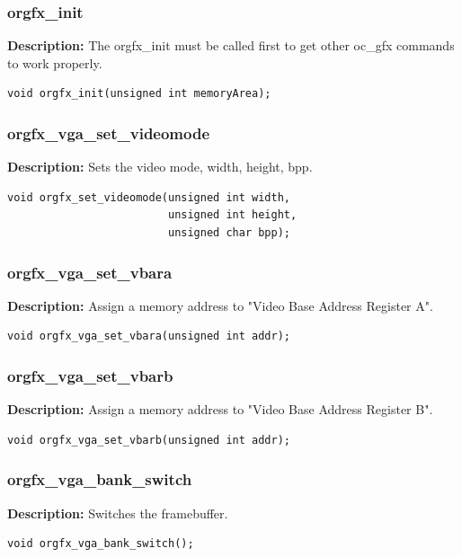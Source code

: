 \documentclass[10pt,a4paper]{article}
\begin{document}
\subsubsection{orgfx\_init}
\textbf{Description:} The orgfx\_init must be called first to get other oc\_gfx commands to work properly.
\begin{lstlisting}
void orgfx_init(unsigned int memoryArea);
\end{lstlisting}

\subsubsection{orgfx\_vga\_set\_videomode}
\textbf{Description:} Sets the video mode, width, height, bpp.
\begin{lstlisting}
void orgfx_set_videomode(unsigned int width, 
                         unsigned int height, 
                         unsigned char bpp);
\end{lstlisting}

\subsubsection{orgfx\_vga\_set\_vbara}
\textbf{Description:} Assign a memory address to "Video Base Address Register A".
\begin{lstlisting}
void orgfx_vga_set_vbara(unsigned int addr);
\end{lstlisting}

\subsubsection{orgfx\_vga\_set\_vbarb}
\textbf{Description:} Assign a memory address to "Video Base Address Register B".
\begin{lstlisting}
void orgfx_vga_set_vbarb(unsigned int addr);
\end{lstlisting}

\subsubsection{orgfx\_vga\_bank\_switch}
\textbf{Description:} Switches the framebuffer.
\begin{lstlisting}
void orgfx_vga_bank_switch();
\end{lstlisting}
\end{document}

